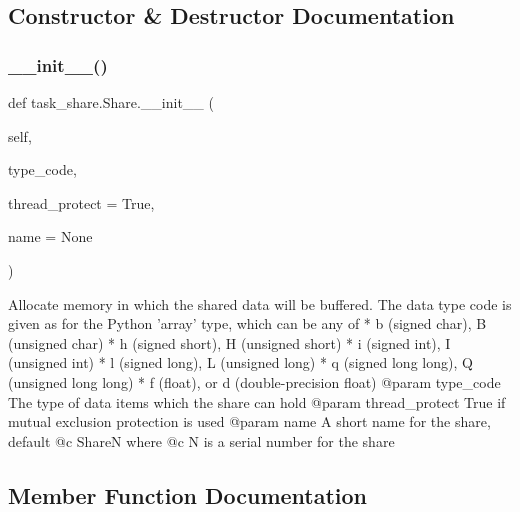 \subsection{Constructor \& Destructor Documentation}
\mbox{\label{classtask__share_1_1Share_a3139fd0c5d1df7fc15e003892d557b9a}} 
\subsubsection{\texorpdfstring{\+\_\+\+\_\+init\+\_\+\+\_\+()}{\_\_init\_\_()}}
{\footnotesize\ttfamily def task\+\_\+share.\+Share.\+\_\+\+\_\+init\+\_\+\+\_\+ (\begin{DoxyParamCaption}\item[{}]{self,  }\item[{}]{type\+\_\+code,  }\item[{}]{thread\+\_\+protect = {\ttfamily True},  }\item[{}]{name = {\ttfamily None} }\end{DoxyParamCaption})}

\begin{DoxyVerb}Allocate memory in which the shared data will be buffered. The 
data type code is given as for the Python 'array' type, which 
can be any of
* b (signed char), B (unsigned char)
* h (signed short), H (unsigned short)
* i (signed int), I (unsigned int)
* l (signed long), L (unsigned long)
* q (signed long long), Q (unsigned long long)
* f (float), or d (double-precision float)
@param type_code The type of data items which the share can hold
@param thread_protect True if mutual exclusion protection is used
@param name A short name for the share, default @c ShareN where @c N
    is a serial number for the share \end{DoxyVerb}
 

\subsection{Member Function Documentation}
\mbox{\label{classtask__share_1_1Share_a09c1c075ae99ea33030dd9de7b9ae470}} 
